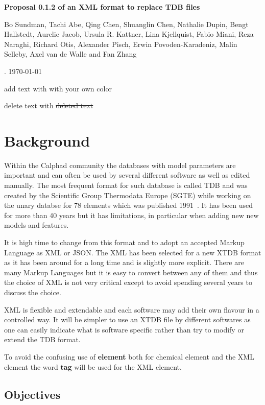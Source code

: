 \documentclass{article}
\begin{document}
\begin{center}

  {\Large \bf Proposal 0.1.2 of an XML format to replace TDB files}


  Bo Sundman, Tachi Abe, Qing Chen, Shuanglin Chen, Nathalie Dupin,
  Bengt Hallstedt, Aurelie Jacob, Ursula R. Kattner, Lina Kjellquist,
  Fabio Miani, Reza Naraghi, Richard Otis, Alexander Pisch, Erwin
  Povoden-Karadeniz, Malin Selleby, Axel van de Walle and Fan Zhang

. \today

\end{center}

add text with {\color{red} with your own color}

delete text with \sout{deleted text}

\section{Background}

Within the Calphad community the databases with model parameters are
important and can often be used by several different software as well
as edited manually.  The most frequent format for such database is
called TDB and was created by the Scientific Group Thermodata Europe
(SGTE) while working on the unary databse for 78 elements which was
published 1991~\cite{91Din}.  It has been used for more than 40 years
but it has limitations, in particular when adding new new models and
features.

It is high time to change from this format and to adopt an accepted
Markup Language as XML or JSON.  The XML has been selected for a new
XTDB format as it has been around for a long time and is slightly more
explicit.  There are many Markup Languages but it is easy to convert
between any of them and thus the choice of XML is not very critical
except to avoid spending several years to discuss the choice.

XML is flexible and extendable and each software may add their own
flavour in a controlled way.  It will be simpler to use an XTDB file
by different softwares as one can easily indicate what is software
specific rather than try to modify or extend the TDB format.

To avoid the confusing use of {\bf element} both for chemical element
and the XML element the word {\bf tag} will be used for the XML
element.

\subsection{Objectives}
\end{document}
